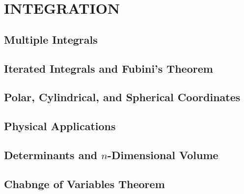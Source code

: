 \section{INTEGRATION}
\subsection{Multiple Integrals}
\subsection{Iterated Integrals and Fubini's Theorem}
\subsection{Polar, Cylindrical, and Spherical Coordinates}
\subsection{Physical Applications}
\subsection{Determinants and $n$-Dimensional Volume}
\subsection{Chabnge of Variables Theorem}
